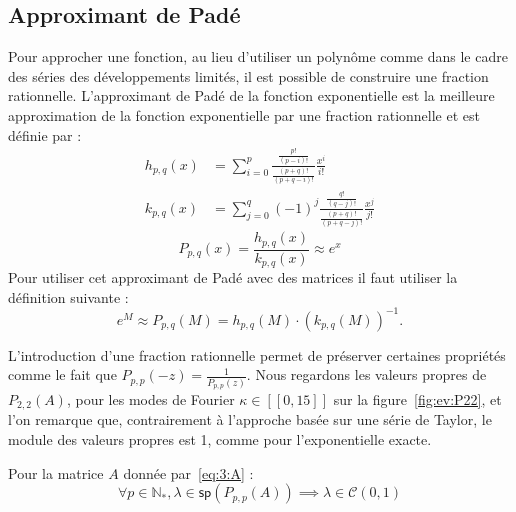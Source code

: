 \subsection{Approximant de Padé}

Pour approcher une fonction, au lieu d'utiliser un polynôme comme dans le cadre des séries des développements limités, il est possible de construire une fraction rationnelle. L'approximant de Padé de la fonction exponentielle est la meilleure approximation de la fonction exponentielle par une fraction rationnelle et est définie par :
$$
  \begin{aligned}
    h_{p,q}(x) &= \sum_{i=0}^p \frac{\frac{p!}{(p-i)!}}{\frac{(p+q)!}{(p+q-i)!}}\frac{x^i}{i!} \\
    k_{p,q}(x) &= \sum_{j=0}^q (-1)^j \frac{\frac{q!}{(q-j)!}}{\frac{(p+q)!}{(p+q-j)!}} \frac{x^j}{j!}
  \end{aligned}
$$
$$
  P_{p,q}(x) = \frac{h_{p,q}(x)}{k_{p,q}(x)} \approx e^x
$$
Pour utiliser cet approximant de Padé avec des matrices il faut utiliser la définition suivante :
$$
  e^M \approx P_{p,q}(M) = h_{p,q}(M)\cdot\left(k_{p,q}(M)\right)^{-1}.
$$

L'introduction d'une fraction rationnelle permet de préserver certaines propriétés comme le fait que $P_{p,p}(-z) = \frac{1}{P_{p,p}(z)}$. Nous regardons les valeurs propres de $P_{2,2}(A)$, pour les modes de Fourier $\kappa\in[\![0,15]\!]$ sur la figure~\ref{fig:ev:P22}, et l'on remarque que, contrairement à l'approche basée sur une série de Taylor, le module des valeurs propres est 1, comme pour l'exponentielle exacte.

\begin{pro}
  Pour la matrice $A$ donnée par~\eqref{eq:3:A} :
  $$
    \forall p\in\mathbb{N}_*, \lambda\in\textsf{sp}(P_{p,p}(A)) \implies \lambda\in\mathcal{C}(0,1)
  $$
\end{pro}

